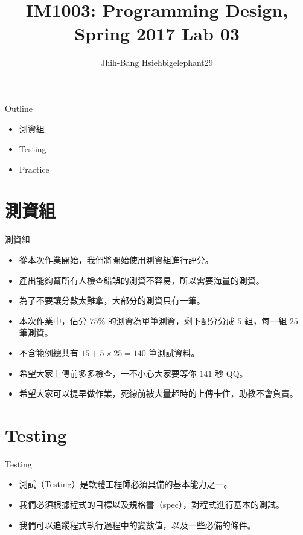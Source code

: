 \documentclass[t]{beamer}
\title{IM1003: Programming Design, Spring 2017  \linebreak Lab 03}
\author[bigelephant29]{Jhih-Bang Hsieh\linebreak \small{bigelephant29}}
\institute{\textbf{National Taiwan University}}
\date{}
\begin{document}
\begin{frame}
  \maketitle
\end{frame}

\begin{frame}{Outline}
  \begin{itemize}
    \item 測資組
    \item Testing
    \item Practice
  \end{itemize}
\end{frame}

\section{測資組}
\begin{frame}{測資組}
  \begin{itemize}
    \item 從本次作業開始，我們將開始使用測資組進行評分。
    \item 產出能夠幫所有人檢查錯誤的測資不容易，所以需要海量的測資。
    \item 為了不要讓分數太難拿，大部分的測資只有一筆。
    \item 本次作業中，佔分 $75\%$ 的測資為單筆測資，剩下配分分成 $5$ 組，每一組 $25$ 筆測資。
    \item 不含範例總共有 $15 + 5 \times 25 = 140$ 筆測試資料。
    \item 希望大家上傳前多多檢查，一不小心大家要等你 $141$ 秒 QQ。
    \item 希望大家可以提早做作業，死線前被大量超時的上傳卡住，助教不會負責。
  \end{itemize}
\end{frame}

\section{Testing}
\begin{frame}{Testing}
  \begin{itemize}
    \item 測試（Testing）是軟體工程師必須具備的基本能力之一。
    \item 我們必須根據程式的目標以及規格書（spec），對程式進行基本的測試。
    \item 我們可以追蹤程式執行過程中的變數值，以及一些必備的條件。
  \end{itemize}
\end{frame}
\end{document}
